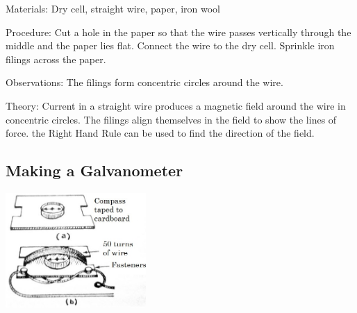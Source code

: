 \begin{multicols}{2}
\begin{description*}
\item[Materials:]{Dry cell, straight wire, paper, iron wool}
\item[Procedure:]{Cut a hole in the paper so that the wire passes vertically through the middle and the paper lies flat. Connect the wire to the dry cell. Sprinkle iron filings across the paper.}
\item[Observations:]{The filings form concentric circles around the wire.}
\item[Theory:]{Current in a straight wire produces a magnetic field around the wire in concentric circles. The filings align themselves in the field to show the lines of force. the Right Hand Rule can be used to find the direction of the field.}
\end{description*}

\subsection{Making a Galvanometer}

\begin{center}
\includegraphics[width=0.4\textwidth]{./img/galvanometer.jpg}
\end{center}


\end{multicols}
